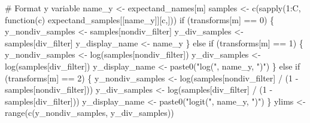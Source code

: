 \documentclass[
  letterpaper,
  DIV=11,
  numbers=noendperiod]{scrartcl}
\newenvironment{Shaded}{\begin{snugshade}}{\end{snugshade}}
\newcommand{\CommentTok}[1]{\textcolor[rgb]{0.37,0.37,0.37}{#1}}
\newcommand{\ControlFlowTok}[1]{\textcolor[rgb]{0.00,0.23,0.31}{#1}}
\newcommand{\DecValTok}[1]{\textcolor[rgb]{0.68,0.00,0.00}{#1}}
\newcommand{\FunctionTok}[1]{\textcolor[rgb]{0.28,0.35,0.67}{#1}}
\newcommand{\NormalTok}[1]{\textcolor[rgb]{0.00,0.23,0.31}{#1}}
\newcommand{\OtherTok}[1]{\textcolor[rgb]{0.00,0.23,0.31}{#1}}
\newcommand{\SpecialCharTok}[1]{\textcolor[rgb]{0.37,0.37,0.37}{#1}}
\newcommand{\StringTok}[1]{\textcolor[rgb]{0.13,0.47,0.30}{#1}}
\begin{document}
\begin{Shaded}
\begin{Highlighting}[]
      \CommentTok{\# Format y variable}
\NormalTok{      name\_y }\OtherTok{\textless{}{-}}\NormalTok{ expectand\_names[m]}
\NormalTok{      samples }\OtherTok{\textless{}{-}} \FunctionTok{c}\NormalTok{(}\FunctionTok{sapply}\NormalTok{(}\DecValTok{1}\SpecialCharTok{:}\NormalTok{C, }
                          \ControlFlowTok{function}\NormalTok{(c) expectand\_samples[[name\_y]][c,]))}
      \ControlFlowTok{if}\NormalTok{ (transforms[m] }\SpecialCharTok{==} \DecValTok{0}\NormalTok{) \{}
\NormalTok{        y\_nondiv\_samples }\OtherTok{\textless{}{-}}\NormalTok{ samples[nondiv\_filter]}
\NormalTok{        y\_div\_samples }\OtherTok{\textless{}{-}}\NormalTok{ samples[div\_filter]}
\NormalTok{        y\_display\_name }\OtherTok{\textless{}{-}}\NormalTok{ name\_y}
\NormalTok{      \} }\ControlFlowTok{else} \ControlFlowTok{if}\NormalTok{ (transforms[m] }\SpecialCharTok{==} \DecValTok{1}\NormalTok{) \{}
\NormalTok{        y\_nondiv\_samples }\OtherTok{\textless{}{-}} \FunctionTok{log}\NormalTok{(samples[nondiv\_filter])}
\NormalTok{        y\_div\_samples }\OtherTok{\textless{}{-}} \FunctionTok{log}\NormalTok{(samples[div\_filter])}
\NormalTok{        y\_display\_name }\OtherTok{\textless{}{-}} \FunctionTok{paste0}\NormalTok{(}\StringTok{"log("}\NormalTok{, name\_y, }\StringTok{")"}\NormalTok{)}
\NormalTok{      \} }\ControlFlowTok{else} \ControlFlowTok{if}\NormalTok{ (transforms[m] }\SpecialCharTok{==} \DecValTok{2}\NormalTok{) \{}
\NormalTok{        y\_nondiv\_samples }\OtherTok{\textless{}{-}} \FunctionTok{log}\NormalTok{(samples[nondiv\_filter] }\SpecialCharTok{/} 
\NormalTok{                                (}\DecValTok{1} \SpecialCharTok{{-}}\NormalTok{ samples[nondiv\_filter]))}
\NormalTok{        y\_div\_samples }\OtherTok{\textless{}{-}} \FunctionTok{log}\NormalTok{(samples[div\_filter] }\SpecialCharTok{/}
\NormalTok{                             (}\DecValTok{1} \SpecialCharTok{{-}}\NormalTok{ samples[div\_filter]))}
\NormalTok{        y\_display\_name }\OtherTok{\textless{}{-}} \FunctionTok{paste0}\NormalTok{(}\StringTok{"logit("}\NormalTok{, name\_y, }\StringTok{")"}\NormalTok{)}
\NormalTok{      \}}
\NormalTok{      ylims }\OtherTok{\textless{}{-}} \FunctionTok{range}\NormalTok{(}\FunctionTok{c}\NormalTok{(y\_nondiv\_samples, y\_div\_samples))}
    

\end{Highlighting}
\end{Shaded}
\end{document}
